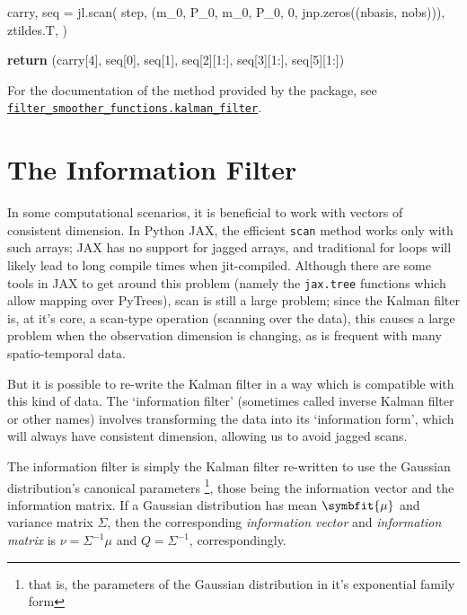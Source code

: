 \documentclass[
]{report}
\newenvironment{Shaded}{\begin{snugshade}}{\end{snugshade}}
\newcommand{\ControlFlowTok}[1]{\textcolor[rgb]{0.00,0.23,0.31}{\textbf{#1}}}
\newcommand{\DecValTok}[1]{\textcolor[rgb]{0.68,0.00,0.00}{#1}}
\newcommand{\NormalTok}[1]{\textcolor[rgb]{0.00,0.23,0.31}{#1}}
\newcommand{\OperatorTok}[1]{\textcolor[rgb]{0.37,0.37,0.37}{#1}}
\newcommand{\bv}[1]{\symbfit{#1}}
\theoremstyle{plain}
\theoremstyle{plain}
\theoremstyle{remark}
\begin{document}
\begin{Shaded}
\begin{Highlighting}[]
\NormalTok{    carry, seq }\OperatorTok{=}\NormalTok{ jl.scan(}
\NormalTok{        step,}
\NormalTok{        (m\_0, P\_0, m\_0, P\_0, }\DecValTok{0}\NormalTok{, jnp.zeros((nbasis, nobs))),}
\NormalTok{        ztildes.T,}
\NormalTok{    )}

    \ControlFlowTok{return}\NormalTok{ (carry[}\DecValTok{4}\NormalTok{], seq[}\DecValTok{0}\NormalTok{], seq[}\DecValTok{1}\NormalTok{], seq[}\DecValTok{2}\NormalTok{][}\DecValTok{1}\NormalTok{:], seq[}\DecValTok{3}\NormalTok{][}\DecValTok{1}\NormalTok{:], seq[}\DecValTok{5}\NormalTok{][}\DecValTok{1}\NormalTok{:])}
\end{Highlighting}
\end{Shaded}

\normalsize

For the documentation of the method provided by the package, see
\href{../reference/kalman_filter.html}{\texttt{filter\_smoother\_functions.kalman\_filter}}.

\section{The Information Filter}\label{the-information-filter}

In some computational scenarios, it is beneficial to work with vectors
of consistent dimension. In Python JAX, the efficient \texttt{scan}
method works only with such arrays; JAX has no support for jagged
arrays, and traditional for loops will likely lead to long compile times
when jit-compiled. Although there are some tools in JAX to get around
this problem (namely the \texttt{jax.tree} functions which allow mapping
over PyTrees), scan is still a large problem; since the Kalman filter
is, at it's core, a scan-type operation (scanning over the data), this
causes a large problem when the observation dimension is changing, as is
frequent with many spatio-temporal data.

But it is possible to re-write the Kalman filter in a way which is
compatible with this kind of data. The `information filter' (sometimes
called inverse Kalman filter or other names) involves transforming the
data into its `information form', which will always have consistent
dimension, allowing us to avoid jagged scans.

The information filter is simply the Kalman filter re-written to use the
Gaussian distribution's canonical parameters \footnote{that is, the
  parameters of the Gaussian distribution in it's exponential family
  form}, those being the information vector and the information matrix.
If a Gaussian distribution has mean \(\bv\mu\) and variance matrix
\(\Sigma\), then the corresponding \emph{information vector} and
\emph{information matrix} is \(\nu = \Sigma^{-1}\mu\) and
\(Q = \Sigma^{-1}\), correspondingly.
\end{document}

